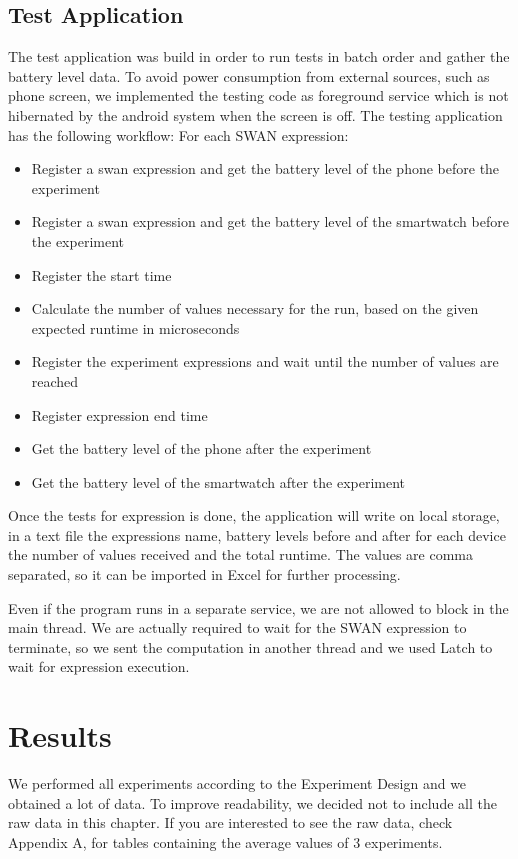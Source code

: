 \subsection{Test Application}
The test application was build in order to run tests in batch order and gather the battery level data. To avoid power consumption from external sources, such as phone screen, we implemented the testing code as foreground service\cite{foreground_service} which is not hibernated by the android system when the screen is off. 
The testing application has the following workflow:
For each SWAN expression:
\begin{itemize}
 \item Register a swan expression and get the battery level of the phone before the experiment
 \item Register a swan expression and get the battery level of the smartwatch before the experiment
 \item Register the start time
 \item Calculate the number of values necessary for the run, based on the given expected runtime in microseconds
 \item Register the experiment expressions and wait until the number of values are reached
 \item Register expression end time
 \item Get the battery level of the phone after the experiment
 \item Get the battery level of the smartwatch after the experiment
\end{itemize}


Once the tests for expression is done, the application will write on local storage, in a text file the expressions name,
battery levels before and after for each device the number of values received and the total runtime.
 The values are comma separated, so it can be imported in Excel for further processing.

Even if the program runs in a separate service, we are not allowed to block in the main thread. 
We are actually required to wait for the SWAN expression to terminate, so we sent the computation in another thread and we used Latch to wait for expression execution.

 \section{Results}

We performed all experiments according to the Experiment Design and we obtained a lot of data. To improve readability,
we decided not to include all the raw data in this chapter. If you are interested to see the raw data, check Appendix A, for tables containing the
average values of 3 experiments.

